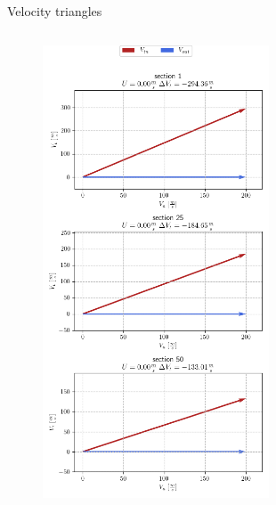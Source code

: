 {\begin{frame}{Velocity triangles}
\begin{columns}
\begin{figure}
					\includegraphics[width=0.6\textwidth]{figures/statorVelocityTriangle.png}
				\end{figure}
		\end{columns}
	\end{frame}
	}

